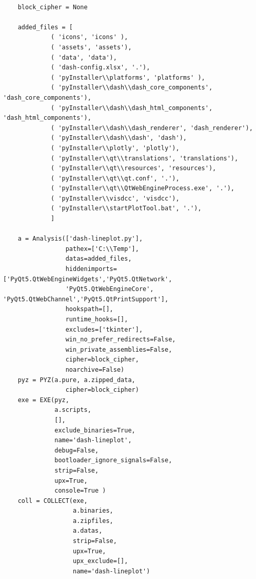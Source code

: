 \footnotesize
\begin{lstlisting}

    block_cipher = None

    added_files = [
             ( 'icons', 'icons' ),
             ( 'assets', 'assets'),
             ( 'data', 'data'),
             ( 'dash-config.xlsx', '.'),
             ( 'pyInstaller\\platforms', 'platforms' ),
             ( 'pyInstaller\\dash\\dash_core_components', 'dash_core_components'),
             ( 'pyInstaller\\dash\\dash_html_components', 'dash_html_components'),
             ( 'pyInstaller\\dash\\dash_renderer', 'dash_renderer'),
             ( 'pyInstaller\\dash\\dash', 'dash'),
             ( 'pyInstaller\\plotly', 'plotly'),
             ( 'pyInstaller\\qt\\translations', 'translations'),
             ( 'pyInstaller\\qt\\resources', 'resources'),
             ( 'pyInstaller\\qt\\qt.conf', '.'),
             ( 'pyInstaller\\qt\\QtWebEngineProcess.exe', '.'),
             ( 'pyInstaller\\visdcc', 'visdcc'),
             ( 'pyInstaller\\startPlotTool.bat', '.'),
             ]

    a = Analysis(['dash-lineplot.py'],
                 pathex=['C:\\Temp'],
                 datas=added_files,
                 hiddenimports=['PyQt5.QtWebEngineWidgets','PyQt5.QtNetwork',
                 'PyQt5.QtWebEngineCore', 'PyQt5.QtWebChannel','PyQt5.QtPrintSupport'],
                 hookspath=[],
                 runtime_hooks=[],
                 excludes=['tkinter'],
                 win_no_prefer_redirects=False,
                 win_private_assemblies=False,
                 cipher=block_cipher,
                 noarchive=False)
    pyz = PYZ(a.pure, a.zipped_data,
                 cipher=block_cipher)
    exe = EXE(pyz,
              a.scripts,
              [],
              exclude_binaries=True,
              name='dash-lineplot',
              debug=False,
              bootloader_ignore_signals=False,
              strip=False,
              upx=True,
              console=True )
    coll = COLLECT(exe,
                   a.binaries,
                   a.zipfiles,
                   a.datas,
                   strip=False,
                   upx=True,
                   upx_exclude=[],
                   name='dash-lineplot')


\end{lstlisting}
\normalsize

